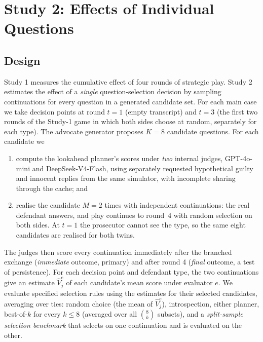 \section{Study 2: Effects of Individual Questions}\label{sec:study2}

\subsection{Design}
Study 1 measures the cumulative effect of four rounds of strategic play. Study 2 estimates the effect of a
\emph{single} question-selection decision by sampling continuations for every question in a generated candidate set. For each main case we take decision points at round $t=1$ (empty transcript) and $t=3$ (the
first two rounds of the Study-1 game in which both sides choose at random, separately for each type). The advocate
generator proposes $K=8$ candidate questions. For each candidate we
\begin{enumerate}
\item compute the lookahead planner's scores under \emph{two} internal judges, GPT-4o-mini and DeepSeek-V4-Flash,
using separately requested hypothetical guilty and innocent replies from the same simulator, with incomplete
sharing through the cache; and
\item realise the candidate $M=2$ times with independent continuations: the real defendant answers, and play continues
to round~4 with random selection on both sides. At $t=1$ the prosecutor cannot see the type, so the same eight
candidates are realised for both twins.
\end{enumerate}
The judges then score every continuation immediately after the branched exchange (\emph{immediate} outcome, primary)
and after round 4 (\emph{final} outcome, a test of persistence). For each decision point and defendant type, the two continuations give an estimate
$\widehat V_j^e$ of each candidate's mean score under evaluator $e$. We evaluate specified selection rules
using the estimates for their selected candidates, averaging over ties: random choice (the mean of $\widehat V_j^e$), introspection, either planner, best-of-$k$
for every $k\le8$ (averaged over all $\binom{8}{k}$ subsets), and a \emph{split-sample selection benchmark} that selects on one
continuation and is evaluated on the other.

